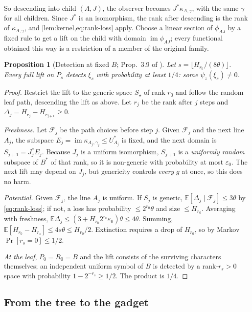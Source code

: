 \documentclass[11pt]{article}
\newtheorem{proposition}[theorem]{Proposition}
\theoremstyle{definition}
\theoremstyle{remark}
\newcommand{\E}{\mathbb E}
\newcommand{\eps}{\varepsilon}
\DeclareMathOperator{\im}{im}
\begin{document}
So descending into child $(A,J)$, the observer becomes $J^*\kappa_{A,\gamma}$,
with the same $\gamma$ for all children. Since $J^*$ is an isomorphism, the
rank after descending is the rank of $\kappa_{A,\gamma}$, and
\cref{lem:kernel,eq:rank-loss} apply. Choose a linear section of $\phi_{AJ}$ by a
fixed rule to get a lift on the child with domain $\im\phi_{AJ}$; every
functional obtained this way is a restriction of a member of the original
family.

\begin{proposition}[Detection at fixed $B$; Prop.~3.9 of \cite{OpenAI-UGC}]\label{prop:detect}
Let $s=\lfloor H_{r_0}/(8\theta)\rfloor$. Every full lift on $P_s$ detects
$\xi_s$ with probability at least $1/4$: some $\psi_z(\xi_s)\ne0$.
\end{proposition}

\begin{proof}
Restrict the lift to the generic space $S_\star$ of rank $r_0$ and follow the
random leaf path, descending the lift as above. Let $r_j$ be the rank after $j$
steps and $\Delta_j=H_{r_j}-H_{r_{j+1}}\ge0$.

\emph{Freshness.} Let $\mathcal F_j$ be the path choices before step $j$. Given
$\mathcal F_j$ and the next line $A_j$, the subspace
$E_j=\im\kappa_{A_j,\gamma_j}\le U_{A_j}^*$ is fixed, and the next domain is
$S_{j+1}=J_j^*E_j$. Because $J_j$ is a uniform isomorphism, $S_{j+1}$ is a
\emph{uniformly random} subspace of $B^*$ of that rank, so it is non-generic
with probability at most $\eps_0$. The next lift may depend on $J_j$, but
genericity controls \emph{every} $g$ at once, so this does no harm.

\emph{Potential.} Given $\mathcal F_j$, the line $A_j$ is uniform. If $S_j$ is
generic, $\E[\Delta_j\mid\mathcal F_j]\le3\theta$ by \eqref{eq:rank-loss}; if
not, a loss has probability $\le2^{r_0}\theta$ and size $\le H_{r_0}$. Averaging
with freshness, $\E\Delta_j\le(3+H_{r_0}2^{r_0}\eps_0)\theta\le4\theta$. Summing,
$\E[H_{r_0}-H_{r_s}]\le4s\theta\le H_{r_0}/2$. Extinction requires a drop of
$H_{r_0}$, so by Markov $\Pr[r_s=0]\le1/2$.

\emph{At the leaf}, $P_0=R_0=B$ and the lift consists of the surviving
characters themselves; an independent uniform symbol of $B$ is detected by a
rank-$r_s>0$ space with probability $1-2^{-r_s}\ge1/2$. The product is $1/4$.
\end{proof}

\subsection{From the tree to the gadget}\label{sec:enlarge}
\end{document}
